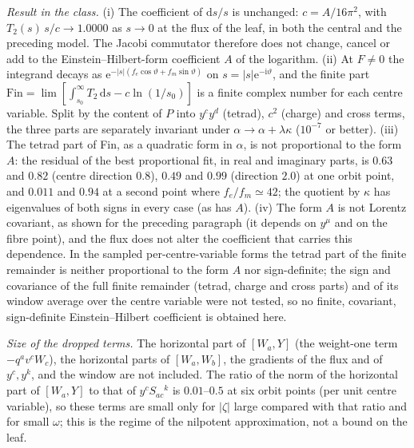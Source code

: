 \emph{Result in the class.} (i) The coefficient of \(\mathrm ds/s\) is unchanged: \(c=A/16\pi^2\), with \(T_2(s)\,s/c\to1.0000\) as \(s\to0\) at the flux of the leaf, in both the central and the preceding model. The Jacobi commutator therefore does not change, cancel or add to the Einstein--Hilbert-form coefficient \(A\) of the logarithm. (ii) At \(F\ne0\) the integrand decays as \(\mathrm e^{-|s|(f_e\cos\vartheta+f_m\sin\vartheta)}\) on \(s=|s|\mathrm e^{-\mathrm i\vartheta}\), and the finite part \(\mathrm{Fin}=\lim[\int_{s_0}^\infty T_2\,\mathrm ds-c\ln(1/s_0)]\) is a finite complex number for each centre variable. Split by the content of \(P\) into \(y^cy^d\) (tetrad), \(c^2\) (charge) and cross terms, the three parts are separately invariant under \(\alpha\to\alpha+\lambda\kappa\) (\(10^{-7}\) or better). (iii) The tetrad part of Fin, as a quadratic form in \(\alpha\), is not proportional to the form \(A\): the residual of the best proportional fit, in real and imaginary parts, is \(0.63\) and \(0.82\) (centre direction \(0.8\)), \(0.49\) and \(0.99\) (direction \(2.0\)) at one orbit point, and \(0.011\) and \(0.94\) at a second point where \(f_e/f_m\simeq42\); the quotient by \(\kappa\) has eigenvalues of both signs in every case (as has \(A\)). (iv) The form \(A\) is not Lorentz covariant, as shown for the preceding paragraph (it depends on \(y^\mu\) and on the fibre point), and the flux does not alter the coefficient that carries this dependence. In the sampled per-centre-variable forms the tetrad part of the finite remainder is neither proportional to the form \(A\) nor sign-definite; the sign and covariance of the full finite remainder (tetrad, charge and cross parts) and of its window average over the centre variable were not tested, so no finite, covariant, sign-definite Einstein--Hilbert coefficient is obtained here.

\emph{Size of the dropped terms.} The horizontal part of \([W_a,Y]\) (the weight-one term \(-q^av^cW_c\)), the horizontal parts of \([W_a,W_b]\), the gradients of the flux and of \(y^c,y^k\), and the window are not included. The ratio of the norm of the horizontal part of \([W_a,Y]\) to that of \(y^cS_{ac}{}^k\) is \(0.01\)--\(0.5\) at six orbit points (per unit centre variable), so these terms are small only for \(|\zeta|\) large compared with that ratio and for small \(\omega\); this is the regime of the nilpotent approximation, not a bound on the leaf.

